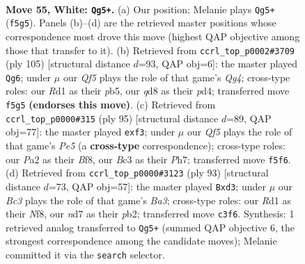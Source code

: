 \documentclass[11pt]{article}
\begin{document}
\clearpage

\begin{figure}[p]\centering
\begin{subfigure}{0.46\textwidth}\centering
\resizebox{\linewidth}{!}{%
\newchessgame
\chessboard[
  setfen={3q2k1/1b1n1p2/3P1n2/5Q2/p1p4P/2B2pP1/P6K/3R4 w - - 10 55},
  showmover=false,
  pgfstyle=straightmove, color=movearrow, markmove={f5-g5}
]}
\caption{}
\end{subfigure}\hfill
\begin{subfigure}{0.46\textwidth}\centering
\resizebox{\linewidth}{!}{%
\newchessgame
\chessboard[
  setfen={4k3/5p2/4p3/1P1pP1q1/3P4/5QPp/1n2N2P/5K2 b - - 7 53},
  showmover=false,
  pgfstyle=straightmove, color=movearrow, markmove={g5-g6}
]}
\caption{}
\end{subfigure}
\\[4pt]
\begin{subfigure}{0.46\textwidth}\centering
\resizebox{\linewidth}{!}{%
\newchessgame
\chessboard[
  setfen={5bk1/7p/3p4/3P3p/3Qpp2/2B2N2/r3qPP1/4N1K1 b - - 1 48},
  showmover=false,
  pgfstyle=straightmove, color=movearrow, markmove={e4-f3}
]}
\caption{}
\end{subfigure}\hfill
\begin{subfigure}{0.46\textwidth}\centering
\resizebox{\linewidth}{!}{%
\newchessgame
\chessboard[
  setfen={5nk1/8/bpp5/p5P1/6P1/P2NQ3/1Pq1B3/6K1 b - - 0 47},
  showmover=false,
  pgfstyle=straightmove, color=movearrow, markmove={a6-d3}
]}
\caption{}
\end{subfigure}
\caption{\textbf{Move 55, White: \texttt{Qg5+}.} (a) Our position; Melanie plays \texttt{Qg5+} (\texttt{f5g5}). Panels (b)--(d) are the retrieved master positions whose correspondence most drove this move (highest QAP objective among those that transfer to it). (b) Retrieved from \texttt{ccrl\_top\_p0002\#3709} (ply 105) [structural distance $d$=93, QAP obj=6]: the master played \texttt{Qg6}; under $\mu$ our \emph{Qf5} plays the role of that game's \emph{Qg4}; cross-type roles: our \emph{R}d1 as their \emph{p}b5, our \emph{q}d8 as their \emph{p}d4; transferred move \texttt{f5g5} \textbf{(endorses this move)}. (c) Retrieved from \texttt{ccrl\_top\_p0000\#315} (ply 95) [structural distance $d$=89, QAP obj=77]: the master played \texttt{exf3}; under $\mu$ our \emph{Qf5} plays the role of that game's \emph{Pe5} (a \textbf{cross-type} correspondence); cross-type roles: our \emph{P}a2 as their \emph{B}f8, our \emph{B}c3 as their \emph{P}h7; transferred move \texttt{f5f6}. (d) Retrieved from \texttt{ccrl\_top\_p0000\#3123} (ply 93) [structural distance $d$=73, QAP obj=57]: the master played \texttt{Bxd3}; under $\mu$ our \emph{Bc3} plays the role of that game's \emph{Ba3}; cross-type roles: our \emph{R}d1 as their \emph{N}f8, our \emph{n}d7 as their \emph{p}b2; transferred move \texttt{c3f6}. Synthesis: 1 retrieved analog transferred to \texttt{Qg5+} (summed QAP objective 6, the strongest correspondence among the candidate moves); Melanie committed it via the \texttt{search} selector.}
\label{fig:thought-m108}
\end{figure}
\end{document}

